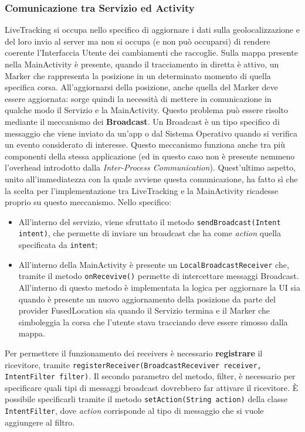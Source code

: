                             \subsubsection{Comunicazione tra Servizio ed Activity}
                                LiveTracking si occupa nello specifico di aggiornare i dati sulla geolocalizzazione e del loro invio al server ma non si occupa (e non può occuparsi) di rendere coerente l'Interfaccia Utente dei cambiamenti che raccoglie. Sulla mappa presente nella MainActivity è presente, quando il tracciamento in diretta è attivo, un Marker che rappresenta la posizione in un determinato momento di quella specifica corsa. All'aggiornarsi della posizione, anche quella del Marker deve essere aggiornata: sorge quindi la necessità di mettere in comunicazione in qualche modo il Servizio e la MainActivity. Questo problema può essere risolto mediante il meccanismo dei \textbf{Broadcast}. Un Broadcast è un tipo specifico di messaggio che viene inviato da un'app o dal Sistema Operativo quando si verifica un evento considerato di interesse. Questo meccanismo funziona anche tra più componenti della stessa applicazione (ed in questo caso non è presente nemmeno l'overhead introdotto dalla \textit{Inter-Process Communication}). Quest'ultimo aspetto, unito all'immediatezza con la quale avviene questa comunicazione, ha fatto sì che la scelta per l'implementazione tra LiveTracking e la MainActivity ricadesse proprio su questo meccanismo. Nello specifico: 
                                \begin{itemize}
                                    \item All'interno del servizio, viene sfruttato il metodo \texttt{sendBroadcast(Intent intent)}, che permette di inviare un broadcast che ha come \textit{action} quella specificata da \texttt{intent};
                                    \item All'interno della MainActivity è presente un \texttt{LocalBroadcastReceiver} che, tramite il metodo \texttt{onRecevive()} permette di intercettare messaggi Broadcast. All'interno di questo metodo è implementata la logica per aggiornare la UI sia quando è presente un nuovo aggiornamento della posizione da parte del provider FusedLocation sia quando il Servizio termina e il Marker che simboleggia la corsa che l'utente stava tracciando deve essere rimosso dalla mappa.
                                \end{itemize}

                                Per permettere il funzionamento dei receivers è necessario \textbf{registrare} il ricevitore, tramite
                                \texttt{registerReceiver(BroadcastReceviver receiver, IntentFilter filter)}.
                                Il secondo parametro del metodo, filter, è necessario per specificare quali tipi di messaggi broadcast dovrebbero far attivare il ricevitore. È possibile specificarli tramite il metodo \texttt{setAction(String action)} della classe \texttt{IntentFilter}, dove \textit{action} corrisponde al tipo di messaggio che si vuole aggiungere al filtro.              